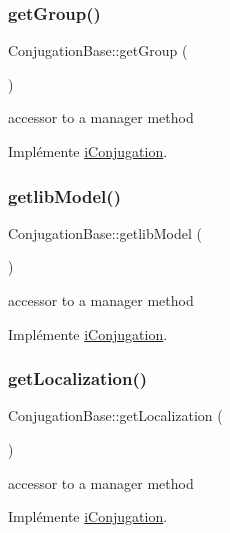 \subsubsection{\texorpdfstring{get\+Group()}{getGroup()}}
{\footnotesize\ttfamily Conjugation\+Base\+::get\+Group (\begin{DoxyParamCaption}{ }\end{DoxyParamCaption})}

accessor to a manager method 

Implémente \hyperlink{interfaceiConjugation_a21390064de33a77b99b26ec5a2e55351}{i\+Conjugation}.

\hypertarget{classConjugationBase_a52db22137154c2fd7a8487406b959652}{}\label{classConjugationBase_a52db22137154c2fd7a8487406b959652} 
\subsubsection{\texorpdfstring{getlib\+Model()}{getlibModel()}}
{\footnotesize\ttfamily Conjugation\+Base\+::getlib\+Model (\begin{DoxyParamCaption}{ }\end{DoxyParamCaption})}

accessor to a manager method 

Implémente \hyperlink{interfaceiConjugation_a2b6dd0a979a98bc50f6f9f7ec9b69e63}{i\+Conjugation}.

\hypertarget{classConjugationBase_a27cc8f5f2a3b502e48c22a5b547181ac}{}\label{classConjugationBase_a27cc8f5f2a3b502e48c22a5b547181ac} 
\subsubsection{\texorpdfstring{get\+Localization()}{getLocalization()}}
{\footnotesize\ttfamily Conjugation\+Base\+::get\+Localization (\begin{DoxyParamCaption}{ }\end{DoxyParamCaption})}

accessor to a manager method 

Implémente \hyperlink{interfaceiConjugation_ab19ceb5ab295fd3d0f862d963379a7e2}{i\+Conjugation}.

\hypertarget{classConjugationBase_aab285eff4995c059a3aa0abec778a390}{}\label{classConjugationBase_aab285eff4995c059a3aa0abec778a390} 
